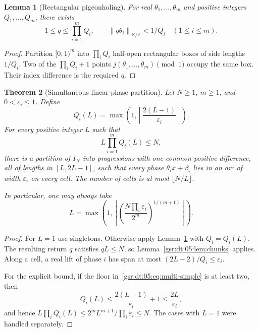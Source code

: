 \documentclass[11pt,letterpaper]{article}
\numberwithin{equation}{section}
\newtheorem{theorem}{Theorem}[section]
\newtheorem{lemma}[theorem]{Lemma}
\theoremstyle{definition}
\theoremstyle{remark}
\newcommand{\R}{\mathbb R}
\newcommand{\Z}{\mathbb Z}
\newcommand{\1}{\mathbf 1}
\newcommand{\cnorm}[1]{\left\|#1\right\|_{\R/\Z}}
\newcommand{\eps}{\varepsilon}
\begin{document}
\begin{lemma}[Rectangular pigeonholing]
\label{gsr:dt:05:lem:boxes}
For real $\theta_1,\ldots,\theta_m$ and positive integers $Q_1,\ldots,Q_m$, there exists
\[
 1\leq q\leq\prod_{i=1}^mQ_i,
 \qquad \cnorm{q\theta_i}<1/Q_i\quad(1\leq i\leq m).
\]
\end{lemma}
\begin{proof}
Partition $[0,1)^m$ into $\prod_iQ_i$ half-open rectangular boxes of side lengths $1/Q_i$. Two of the $\prod_iQ_i+1$ points $j(\theta_1,\ldots,\theta_m)\pmod1$ occupy the same box. Their index difference is the required $q$.
\end{proof}

\begin{theorem}[Simultaneous linear-phase partition]
\label{gsr:dt:05:thm:multi}
Let $N\geq1$, $m\geq1$, and $0<\eps_i\leq1$. Define
\begin{equation}
 Q_i(L)=\max\left(1,\left\lceil\frac{2(L-1)}{\eps_i}\right\rceil\right).
 \label{gsr:dt:05:eq:Qi}
\end{equation}
For every positive integer $L$ such that
\begin{equation}
 L\prod_{i=1}^m Q_i(L)\leq N,
 \label{gsr:dt:05:eq:multi-feasibility}
\end{equation}
there is a partition of $I_N$ into progressions with one common positive difference, all of lengths in $[L,2L-1]$, such that every phase $\theta_i x+\beta_i$ lies in an arc of width $\eps_i$ on every cell. The number of cells is at most $\lfloor N/L\rfloor$.

In particular, one may always take
\begin{equation}
 L=\max\left(1,\left\lfloor
 \left(\frac{N\prod_i\eps_i}{2^m}\right)^{1/(m+1)}
 \right\rfloor\right).
 \label{gsr:dt:05:eq:multi-simple}
\end{equation}
\end{theorem}
\begin{proof}
For $L=1$ use singletons. Otherwise apply Lemma~\ref{gsr:dt:05:lem:boxes} with $Q_i=Q_i(L)$. The resulting return $q$ satisfies $qL\leq N$, so Lemma~\ref{gsr:dt:05:lem:chunks} applies. Along a cell, a real lift of phase $i$ has span at most $(2L-2)/Q_i\leq\eps_i$.

For the explicit bound, if the floor in~\eqref{gsr:dt:05:eq:multi-simple} is at least two, then
\[
 Q_i(L)\leq\frac{2(L-1)}{\eps_i}+1\leq\frac{2L}{\eps_i},
\]
and hence $L\prod_iQ_i(L)\leq2^m L^{m+1}/\prod_i\eps_i\leq N$. The cases with $L=1$ were handled separately.
\end{proof}
\end{document}
